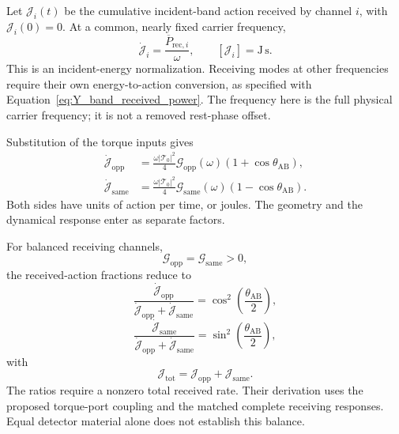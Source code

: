 Let $\mathcal J_i(t)$ be the cumulative incident-band action received by channel $i$, with $\mathcal J_i(0)=0$. At a common, nearly fixed carrier frequency,
\begin{equation}
    \dot{\mathcal J}_i
    =\frac{\overline P_{\mathrm{rec},i}}{\omega},
    \qquad [\mathcal J_i]=\mathrm{J\,s}.
    \label{eq:entanglement_action_absorption}
\end{equation}
This is an incident-energy normalization. Receiving modes at other frequencies require their own energy-to-action conversion, as specified with Equation~\eqref{eq:Y_band_received_power}. The frequency here is the full physical carrier frequency; it is not a removed rest-phase offset.

Substitution of the torque inputs gives
\begin{equation}
    \boxed{
    \begin{aligned}
    \dot{\mathcal J}_{\mathrm{opp}}
    &=\frac{\omega|\mathcal T_0|^2}{4}
      \mathcal G_{\mathrm{opp}}(\omega)(1+\cos\theta_{\mathrm{AB}}),\\
    \dot{\mathcal J}_{\mathrm{same}}
    &=\frac{\omega|\mathcal T_0|^2}{4}
      \mathcal G_{\mathrm{same}}(\omega)(1-\cos\theta_{\mathrm{AB}}).
    \end{aligned}
    }
\end{equation}
Both sides have units of action per time, or joules. The geometry and the dynamical response enter as separate factors.

For balanced receiving channels,
\begin{equation}
    \mathcal G_{\mathrm{opp}}=\mathcal G_{\mathrm{same}}>0,
\end{equation}
the received-action fractions reduce to
\begin{equation}
    \boxed{
    \frac{\dot{\mathcal J}_{\mathrm{opp}}}
    {\dot{\mathcal J}_{\mathrm{opp}}+\dot{\mathcal J}_{\mathrm{same}}}
    =\cos^2\!\left(\frac{\theta_{\mathrm{AB}}}{2}\right)
    },
    \label{eq:entanglement_action_opp}
\end{equation}
\begin{equation}
    \boxed{
    \frac{\dot{\mathcal J}_{\mathrm{same}}}
    {\dot{\mathcal J}_{\mathrm{opp}}+\dot{\mathcal J}_{\mathrm{same}}}
    =\sin^2\!\left(\frac{\theta_{\mathrm{AB}}}{2}\right)
    },
    \label{eq:entanglement_action_same}
\end{equation}
with
\begin{equation}
    \mathcal J_{\mathrm{tot}}
    =\mathcal J_{\mathrm{opp}}+\mathcal J_{\mathrm{same}}.
    \label{eq:entanglement_action_normalization}
\end{equation}
The ratios require a nonzero total received rate. Their derivation uses the proposed torque-port coupling and the matched complete receiving responses. Equal detector material alone does not establish this balance.

